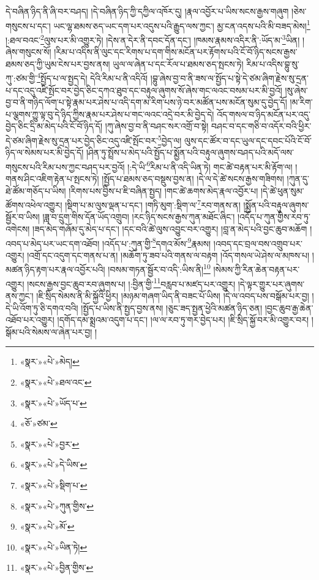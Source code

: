 དེ་བཞིན་ཉིད་ནི་ཞི་བར་བཤད། །དེ་བཞིན་ཉིད་ཀྱི་དཀྱིལ་འཁོར་དུ། །རྣལ་འབྱོར་པ་ཡིས་སངས་རྒྱས་གཞུག །ཅེས་གསུངས་པ་དང་། ཡང་ལྷ་ཐམས་ཅད་ཡང་དག་པར་འདུས་པའི་རྒྱུད་ལས་ཀྱང་། མྱ་ངན་འདས་པའི་མི་བཟད་མེས།\footnote{«སྣར་»«པེ་»མེད།} །:ཐལ་བའང་\footnote{«སྣར་»«པེ་»ཐལ་འང་}ལུས་པར་མི་འགྱུར་ཏེ། །དེས་ན་དེར་ནི་དབང་དོན་དང་། །ཁམས་རྣམས་འདིར་ནི་:ཡོད་མ་\footnote{«སྣར་»«པེ་»ཡོད་པ་}ཡིན། །ཞེས་གསུངས་སོ། །རིམ་པ་འདིས་ནི་ལུང་དང་རིགས་པ་དག་གིས་མངོན་པར་རྟོགས་པའི་ངོ་བོ་ཉིད་སངས་རྒྱས་ཐམས་ཅད་ཀྱི་ཡུམ་ངེས་པར་བྱས་ནས། ཡུལ་ལ་ཞེན་པ་དང་རོལ་པ་ཐམས་ཅད་སྤངས་ཏེ། རིམ་པ་འདིས་བྷུ་སུ་ཀུ་:ཙམ་གྱི་\footnote{«ཅོ་»ཙམ་}སྤྱོད་པ་ལ་སྤྱད་དེ། དེའི་རིམ་པ་ནི་འདིའོ། །བྷུ་ཞེས་བྱ་བ་ནི་ཟས་ལ་སྤྱོད་པ་སྟེ་དེ་ཙམ་ཞིག་རྗེས་སུ་དྲན་པ་དང་འདུ་འཛི་སྤོང་བར་བྱེད་ཅིང་དཀའ་ཐུབ་དང་བརྟུལ་ཞུགས་སོ་ཞེས་གང་ལའང་བསམ་པར་མི་བྱའོ། །སུ་ཞེས་བྱ་བ་ནི་གཉིད་ལོག་པ་སྟེ་རྣམ་པར་ཤེས་པ་འདི་དག་མ་རིག་པས་ཉེ་བར་མཚོན་པས་མངོན་སུམ་དུ་བྱེད་དོ། །མ་རིག་པ་ལྕགས་ཀྱུ་ལྟ་བུ་དེ་ཉིད་ཀྱིས་རྣམ་པར་ཤེས་པ་གང་ལའང་འདྲེ་བར་མི་བྱེད་དེ། འོད་གསལ་བ་ཉིད་མངོན་པར་འདུ་བྱེད་ཅིང་དྲི་མ་མེད་པའི་ངོ་བོ་ཉིད་དོ། །ཀུ་ཞེས་བྱ་བ་ནི་བཤང་སར་འགྲོ་བ་སྟེ། བཤང་བ་དང་གཅི་བ་འདོར་བའི་ཕྱིར་དེ་ཙམ་ཞིག་རྗེས་སུ་དྲན་པར་བྱེད་ཅིང་འདུ་འཛི་སྤོང་བར་\footnote{«སྣར་»«པེ་»བྱར་}བྱེད་ལ། ལུས་དང་ཚོར་བ་དང་ཡུལ་དང་དབང་པོའི་ངོ་བོ་ཉིད་ལ་སེམས་པར་མི་བྱེད་དོ། །ཤིན་ཏུ་སྤྲོས་པ་མེད་པའི་སྤྱོད་པ་སྨྱོན་པའི་བརྟུལ་ཞུགས་བཤད་པའི་མདོ་ལས་གསུངས་པའི་རིམ་པས་ཀྱང་བཤད་པར་བྱའོ། །:དེ་ཡི་\footnote{«སྣར་»«པེ་»དེ་ཡིས་}རིམ་པ་ནི་འདི་ཡིན་ཏེ། གང་ཚེ་བརྟན་པར་མི་རྟོག་ལ། །གནས་ཤིང་འཇིག་རྟེན་པ་སྤངས་ཏེ། །སྤྱོད་པ་ཐམས་ཅད་བསྡུས་བྱས་ན། །དེ་ལ་དེ་ཚེ་སངས་རྒྱས་གཟིགས། །ཀུན་དུ་ཐེ་ཚོམ་གཅོད་པ་ཡིས། །རིགས་པས་བྱིས་པ་ཇི་བཞིན་སྤྱད། །གང་ཚེ་ཆགས་མེད་རྣལ་འབྱོར་པ། །དེ་ཚེ་ཕུན་སུམ་ཚོགས་འཕེལ་འགྱུར། །སྡིག་པ་མ་ལུས་ལྡན་པ་དང་། །གཏི་མུག་:སྡིག་ལ་\footnote{«སྣར་»«པེ་»སྡིག་པ་}རབ་གནས་ན། །སྨྱོན་པའི་བརྟུལ་ཞུགས་སྦྱོར་བ་ཡིས། །ཟླ་བ་དྲུག་གིས་དོན་ཡོད་འགྲུབ། །རང་ཉིད་སངས་རྒྱས་ཀུན་མཐོང་ཞིང་། །འདོད་པ་ཀུན་གྱིས་རབ་ཏུ་འགེངས། །ཟད་མེད་གཞོམ་དུ་མེད་པ་དང་། །དང་བའི་ཚེ་ལུས་འབྱུང་བར་འགྱུར། །བླ་ན་མེད་པའི་བྱང་ཆུབ་མཆོག །འབད་པ་མེད་པར་ཡང་དག་འཐོབ། །འདོད་པ་:ཀུན་གྱི་\footnote{«སྣར་»«པེ་»ཀུན་གྱིས་}དགའ་མོས་\footnote{«སྣར་»«པེ་»མོ་}རྣམས། །འབད་དང་བྲལ་བས་འགྲུབ་པར་འགྱུར། །འགྲོ་དང་འདུག་དང་གནས་པ་ན། །མཆོག་ཏུ་ཟབ་པའི་གནས་ལ་བརྟག །འོད་གསལ་ཡེ་ཤེས་ལ་མཁས་པ། །མཚན་ཉིད་རྟག་པར་རྣལ་འབྱོར་པའི། །བསམ་གཏན་སྦྱོར་བ་འདི་:ཡིས་ནི།\footnote{«སྣར་»«པེ་»ཡིན་ཏེ།} །སེམས་ཀྱི་རིན་ཆེན་བརྟན་པར་འགྱུར། །སངས་རྒྱས་བྱང་ཆུབ་རབ་ཞུགས་པ། །:བྱིན་གྱི་\footnote{«སྣར་»«པེ་»བྱིན་གྱིས་}བརླབ་པ་མཛད་པར་འགྱུར། །དེ་ལྟར་གྱུར་པར་ཞུགས་ནས་ཀྱང་། །ཇི་སྲིད་སེམས་ནི་མི་སྐྱོའི་ཕྱིར། །མཉམ་གཞག་ཡིད་ནི་བཟང་པོ་ཡིས། །དེ་ལ་འབད་པས་བསྒོམ་པར་བྱ། །དེ་ཡི་འོག་ཏུ་ཅི་དགའ་བའི། །སྤྱོད་པ་ཡིས་ནི་སྤྱད་བྱས་ནས། །ཅུང་ཟད་སྤྱན་ཕྱེའི་མཚན་ཉིད་ཅན། །བྱང་ཆུབ་རྒྱ་ཆེན་འཐོབ་པར་འགྱུར། །དགོད་དམ་སྨྲའམ་འདུག་པ་དང་། །ལ་ལ་རབ་ཏུ་གར་བྱེད་པར། །ཇི་སྲིད་སྐྱོ་བར་མི་འགྱུར་བར། །སྒོམ་པའི་སེམས་ལ་ཞེན་པར་བྱ། །
